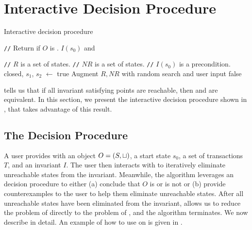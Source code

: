 \section{Interactive Decision Procedure}
\newcommand{\Helper}{\textsc{Helper}}
\newcommand{\IsIclosed}{\textsc{IsIclosed}}
\newcommand{\IsInvConfluent}{\textsc{IsInvConfluent}}

\newcommand{\algocomment}[1]{\State \textcolor{flatdenim}{\texttt{//} #1}}
\begin{algorithm}[t]
  \caption{Interactive \invariantconfluence{} decision procedure}%
  \begin{algorithmic}
    \algocomment{Return if $O$ is \sTIconfluent{}.}
      \State
        \Return $I(s_0)$ and
    \EndFunction

    \State

    \algocomment{$R$ is a set of \sTIreachable{} states.}
    \algocomment{$NR$ is a set of \sTIunreachable{} states.}
    \algocomment{$I(s_0)$ is a precondition.}
      \State closed, $s_1$, $s_2$ $\gets$ 
        \State \Return true
      \EndIf
      \State Augment $R, NR$ with random search and user input
        \State \Return false
      \EndIf
      \State \Return {}
    \EndFunction
  \end{algorithmic}
\end{algorithm}

 tells us that if all invariant
satisfying points are reachable, then \invariantclosure{} and
\invariantconfluence{} are equivalent. In this section, we present the
interactive \invariantconfluence{} decision procedure shown in
, that takes advantage of this result.

\subsection{The Decision Procedure}
A user provides  with an object $O = (S,
\sqcup)$, a start state $s_0$, a set of transactions $T$, and an invariant
$I$. The user then interacts with  to
iteratively eliminate unreachable states from the invariant. Meanwhile, the
algorithm leverages an \invariantclosure{} decision procedure to either (a)
conclude that $O$ is or is not \sTIconfluent{} or (b) provide counterexamples
to the user to help them eliminate unreachable states. After all unreachable
states have been eliminated from the invariant,
 allows us to reduce the problem of
\invariantconfluence{} directly to the problem of \invariantclosure{}, and the
algorithm terminates.
%
We now describe  in detail. An example of
how to use  on  is given
in .

